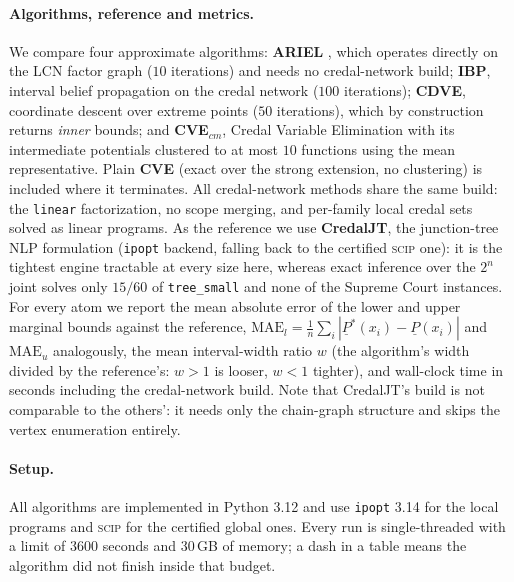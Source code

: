 \documentclass{article}
\begin{document}
\paragraph{Algorithms, reference and metrics.}
We compare four approximate algorithms: \textbf{ARIEL} \cite{marinescu2023lcn},
which operates directly on the LCN factor graph ($10$ iterations) and needs no
credal-network build; \textbf{IBP}, interval belief propagation on the credal
network ($100$ iterations); \textbf{CDVE}, coordinate descent over extreme points
($50$ iterations), which by construction returns \emph{inner} bounds; and
\textbf{CVE$_{cm}$}, Credal Variable Elimination with its intermediate
potentials clustered to at most $10$ functions using the mean representative.
Plain \textbf{CVE} (exact over the strong extension, no clustering) is included
where it terminates. All credal-network methods share the same build:
the \texttt{linear} factorization, no scope merging, and per-family local credal
sets solved as linear programs. As the reference we use \textbf{CredalJT}, the junction-tree NLP formulation
(\texttt{ipopt} backend, falling back to the certified \textsc{scip} one): it is the
tightest engine tractable at every size here, whereas exact inference over the
$2^n$ joint solves only $15/60$ of \texttt{tree\_small} and none of the Supreme
Court instances. For every atom we report the mean
absolute error of the lower and upper marginal bounds against the reference,
$\mathrm{MAE}_{l} = \frac{1}{n}\sum_i |\underline{P}^{*}(x_i) -
\underline{P}(x_i)|$ and $\mathrm{MAE}_{u}$ analogously, the mean interval-width
ratio $w$ (the algorithm's width divided by the reference's: $w > 1$ is looser,
$w < 1$ tighter), and wall-clock time in seconds including the credal-network
build. Note that CredalJT's build is not comparable to the others': it needs only
the chain-graph structure and skips the vertex enumeration entirely.

\paragraph{Setup.}
All algorithms are implemented in Python 3.12 and use \texttt{ipopt} 3.14
\cite{ipopt} for the local programs and \textsc{scip} for the certified global
ones. Every run is single-threaded with a limit of $3600$ seconds and $30$\,GB of
memory; a dash in a table means the algorithm did not finish inside that budget.
\end{document}
